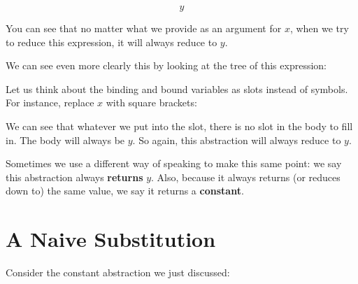\documentclass{book}
\numberwithin{equation}{chapter}
\newcommand{\vocab}{\textbf}
\begin{document}
\begin{equation}
y
\end{equation}

\noindent
You can see that no matter what we provide as an argument for $x$, when we try to reduce this expression, it will always reduce to $y$. 

We can see even more clearly this by looking at the tree of this expression:

\begin{center}
\end{center}

\noindent
Let us think about the binding and bound variables as slots instead of symbols. For instance, replace $x$ with square brackets:

\begin{center}
\end{center}

\noindent
We can see that whatever we put into the slot, there is no slot in the body to fill in. The body will always be $y$. So again, this abstraction will always reduce to $y$.

Sometimes we use a different way of speaking to make this same point: we say this abstraction always \vocab{returns} $y$. Also, because it always returns (or reduces down to) the same value, we say it returns a \vocab{constant}.


\section{A Naive Substitution}

Consider the constant abstraction we just discussed:
\end{document}
